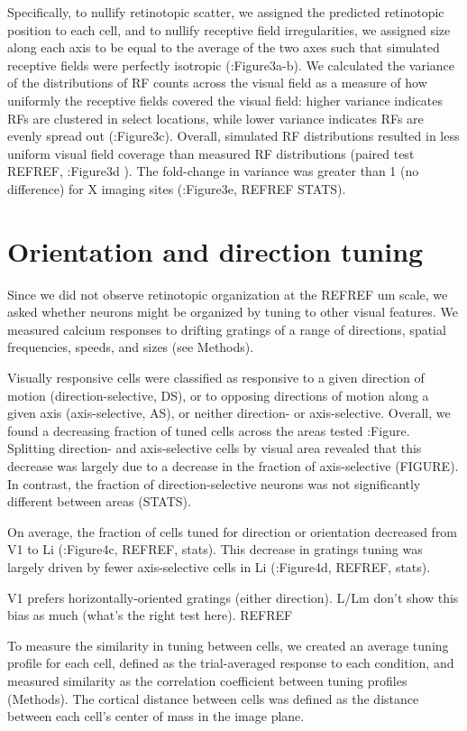 Specifically, to nullify retinotopic scatter, we assigned the predicted retinotopic position to each cell, and to nullify receptive field irregularities, we assigned size along each axis to be equal to the average of the two axes such that simulated receptive fields were perfectly isotropic ({\fig:Figure3a-b}). We calculated the variance of the distributions of RF counts across the visual field as a measure of how uniformly the receptive fields covered the visual field:  higher variance indicates RFs are clustered in select locations, while lower variance indicates RFs are evenly spread out ({\fig:Figure3c}). Overall, simulated RF distributions resulted in less uniform visual field coverage than measured RF distributions (paired test REFREF, {\fig:Figure3d} ). The fold-change in variance was greater than 1 (no difference) for X imaging sites ({\fig:Figure3e}, REFREF STATS).  


\section{Orientation and direction tuning}
Since we did not observe retinotopic organization at the REFREF um scale, we asked whether neurons might be organized by tuning to other visual features. We measured calcium responses to drifting gratings of a range of directions, spatial frequencies, speeds, and sizes (see Methods). 

Visually responsive cells were classified as responsive to a given direction of motion (direction-selective, DS), or to opposing directions of motion along a given axis (axis-selective, AS), or neither direction- or axis-selective. Overall, we found a decreasing fraction of tuned cells across the areas tested {\fig:Figure}. Splitting direction- and axis-selective cells by visual area revealed that this decrease was largely due to a decrease in the fraction of axis-selective (FIGURE). In contrast, the fraction of direction-selective neurons was not significantly different between areas (STATS).   

On average, the fraction of cells tuned for direction or orientation decreased from V1 to Li ({\fig:Figure4c}, REFREF, stats). This decrease in gratings tuning was largely driven by fewer axis-selective cells in Li ({\fig:Figure4d}, REFREF, stats). 

V1 prefers horizontally-oriented gratings (either direction). L/Lm don’t show this bias as much (what’s the right test here). REFREF


To measure the similarity in tuning between cells, we created an average tuning profile for each cell, defined as the trial-averaged response to each condition, and measured similarity as the correlation coefficient between tuning profiles (Methods). The cortical distance between cells was defined as the distance between each cell’s center of mass in the image plane. 


